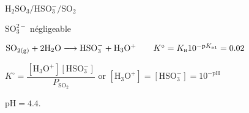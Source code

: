 \begin{solution}
\begin{questions}

    \question $\mathrm{H_2SO_3/HSO_3^-/SO_{2}}$
    
    \question $\mathrm{SO_{3}^{2-}}$ négligeable

    \question $\mathrm{SO_{2(g)} + 2 H_2O \longrightarrow HSO_3^- + H_3O^+} \qquad K^\circ = K_\textsc{h} 10^{-\text{p}K_\text{a1}} = 0.02$
    
    \question $K^\circ = \dfrac{\mathrm{[H_3O^+][HSO_3^{-}]}}{P_\mathrm{SO_2}}$ or $\mathrm{[H_3O^+] = [HSO_3^{-}] = 10^{-pH}}$

    $\text{pH} = 4.4$.
    
\end{questions}
\end{solution}